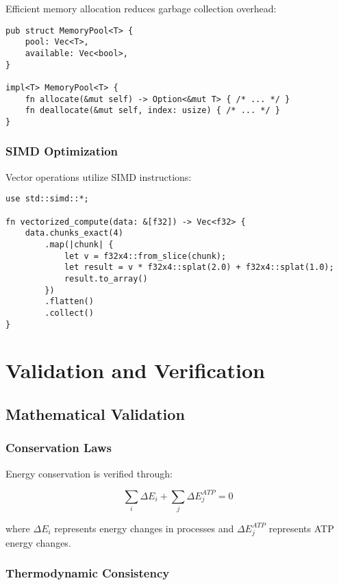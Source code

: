 \documentclass[12pt,a4paper]{article}
\begin{document}
Efficient memory allocation reduces garbage collection overhead:

\begin{lstlisting}[style=ruststyle]
pub struct MemoryPool<T> {
    pool: Vec<T>,
    available: Vec<bool>,
}

impl<T> MemoryPool<T> {
    fn allocate(&mut self) -> Option<&mut T> { /* ... */ }
    fn deallocate(&mut self, index: usize) { /* ... */ }
}
\end{lstlisting}

\subsubsection{SIMD Optimization}

Vector operations utilize SIMD instructions:

\begin{lstlisting}[style=ruststyle]
use std::simd::*;

fn vectorized_compute(data: &[f32]) -> Vec<f32> {
    data.chunks_exact(4)
        .map(|chunk| {
            let v = f32x4::from_slice(chunk);
            let result = v * f32x4::splat(2.0) + f32x4::splat(1.0);
            result.to_array()
        })
        .flatten()
        .collect()
}
\end{lstlisting}

\section{Validation and Verification}

\subsection{Mathematical Validation}

\subsubsection{Conservation Laws}

Energy conservation is verified through:

\begin{equation}
\sum_i \Delta E_i + \sum_j \Delta E_j^{ATP} = 0
\end{equation}

where $\Delta E_i$ represents energy changes in processes and $\Delta E_j^{ATP}$ represents ATP energy changes.

\subsubsection{Thermodynamic Consistency}
\end{document}
